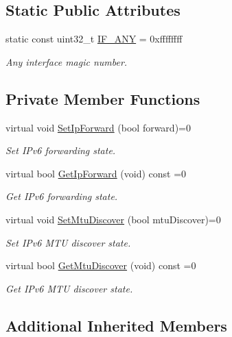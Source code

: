 \subsection*{Static Public Attributes}
\begin{DoxyCompactItemize}
\item 
static const uint32\+\_\+t \hyperlink{classns3_1_1Ipv6_a1e55b17e6e1a4e1b439778543458bbe3}{I\+F\+\_\+\+A\+NY} = 0xffffffff
\begin{DoxyCompactList}\small\item\em Any interface magic number. \end{DoxyCompactList}\end{DoxyCompactItemize}
\subsection*{Private Member Functions}
\begin{DoxyCompactItemize}
\item 
virtual void \hyperlink{classns3_1_1Ipv6_a173e9acf3a03e1d333ca3be56a6c4f38}{Set\+Ip\+Forward} (bool forward)=0
\begin{DoxyCompactList}\small\item\em Set I\+Pv6 forwarding state. \end{DoxyCompactList}\item 
virtual bool \hyperlink{classns3_1_1Ipv6_a26466999fd77426c00a4afd8b9a1ba32}{Get\+Ip\+Forward} (void) const =0
\begin{DoxyCompactList}\small\item\em Get I\+Pv6 forwarding state. \end{DoxyCompactList}\item 
virtual void \hyperlink{classns3_1_1Ipv6_a3204b23a92a2495b428bd882a988369a}{Set\+Mtu\+Discover} (bool mtu\+Discover)=0
\begin{DoxyCompactList}\small\item\em Set I\+Pv6 M\+TU discover state. \end{DoxyCompactList}\item 
virtual bool \hyperlink{classns3_1_1Ipv6_a0de538c1b10148675d4d49efa32258f9}{Get\+Mtu\+Discover} (void) const =0
\begin{DoxyCompactList}\small\item\em Get I\+Pv6 M\+TU discover state. \end{DoxyCompactList}\end{DoxyCompactItemize}
\subsection*{Additional Inherited Members}


